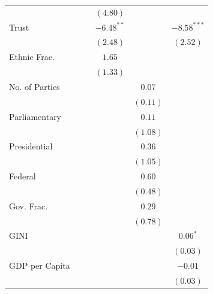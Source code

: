 \documentclass[a4paper]{article}\usepackage{graphicx, color}
\begin{document}
\begin{table}
\begin{center}
\begin{tabular}{l c c c c c }
                     &               &              & $(4.80)$     &             &               \\
Trust                &               &              & $-6.48^{**}$ &             & $-8.58^{***}$ \\
                     &               &              & $(2.48)$     &             & $(2.52)$      \\
Ethnic Frac.         &               &              & $1.65$       &             &               \\
                     &               &              & $(1.33)$     &             &               \\
No. of Parties       &               &              &              & $0.07$      &               \\
                     &               &              &              & $(0.11)$    &               \\
Parliamentary        &               &              &              & $0.11$      &               \\
                     &               &              &              & $(1.08)$    &               \\
Presidential         &               &              &              & $0.36$      &               \\
                     &               &              &              & $(1.05)$    &               \\
Federal              &               &              &              & $0.60$      &               \\
                     &               &              &              & $(0.48)$    &               \\
Gov. Frac.           &               &              &              & $0.29$      &               \\
                     &               &              &              & $(0.78)$    &               \\
GINI                 &               &              &              &             & $0.06^{*}$    \\
                     &               &              &              &             & $(0.03)$      \\
GDP per Capita       &               &              &              &             & $-0.01$       \\
                     &               &              &              &             & $(0.03)$      \\

\end{tabular}
\end{center}
\end{table}
\end{document}
